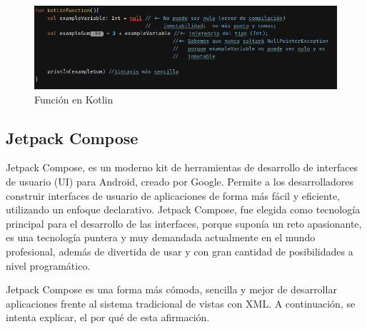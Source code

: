 \begin{figure}[h]
	\centering
	\includegraphics[width = 1\textwidth]{Imagenes/Fuentes/kotlinFun.png}
	\caption{Función en Kotlin}
	\label{fig:kotlinFun}
\end{figure}

\hypertarget{subsec:compose}{}
\subsection{Jetpack Compose}
Jetpack Compose\hyperlink{cap:biblio}{}, es un moderno kit de herramientas de desarrollo de interfaces de usuario (UI) para Android, creado por Google. Permite a los desarrolladores construir interfaces de usuario de aplicaciones de forma más fácil y eficiente, utilizando un enfoque declarativo. Jetpack Compose, fue elegida como tecnología principal para el desarrollo de las interfaces, porque suponía un reto apasionante, es una tecnología puntera y muy demandada actualmente en el mundo profesional, además de divertida de usar y con gran cantidad de posibilidades a nivel programático. 

Jetpack Compose es una forma más cómoda, sencilla y mejor de desarrollar aplicaciones frente al sistema tradicional de vistas con XML. A continuación, se intenta explicar, el por qué de esta afirmación.

